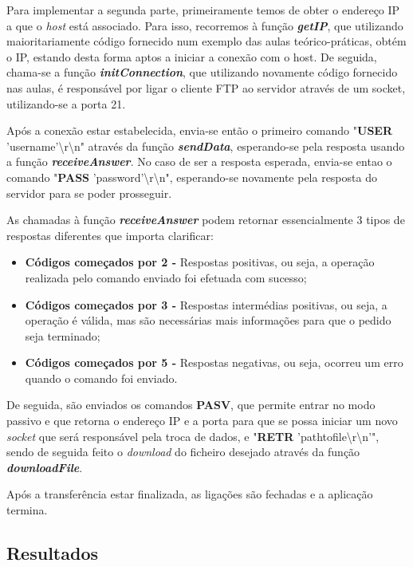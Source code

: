 \documentclass[11pt]{article}
\begin{document}
Para implementar a segunda parte, primeiramente temos de obter o endereço IP a que o \emph{host} está associado. Para isso, recorremos à função \textit{\textbf{getIP}}, que utilizando maioritariamente código fornecido num exemplo das aulas teórico-práticas, obtém o IP, estando desta forma aptos a iniciar a conexão com o host. De seguida, chama-se a função \textit{\textbf{initConnection}}, que utilizando novamente código fornecido nas aulas, é responsável por ligar o cliente FTP ao servidor através de um socket, utilizando-se a porta 21.

Após a conexão estar estabelecida, envia-se então o primeiro comando "\textbf{USER} 'username'\textbackslash r\textbackslash n" através da função \textit{\textbf{sendData}}, esperando-se pela resposta usando a função \textit{\textbf{receiveAnswer}}. No caso de ser a resposta esperada, envia-se entao o comando "\textbf{PASS} 'password'\textbackslash r\textbackslash n", esperando-se novamente pela resposta do servidor para se poder prosseguir.

As chamadas à função \textit{\textbf{receiveAnswer}} podem retornar essencialmente 3 tipos de respostas diferentes que importa clarificar:

\begin{itemize}
    \item \textbf{Códigos começados por 2 -} Respostas positivas, ou seja, a operação realizada pelo comando enviado foi efetuada com sucesso;
    \item \textbf{Códigos começados por 3 -} Respostas intermédias positivas, ou seja, a operação é válida, mas são necessárias mais informações para que o pedido seja terminado;
    \item \textbf{Códigos começados por 5 -} Respostas negativas, ou seja, ocorreu um erro quando o comando foi enviado.
\end{itemize}

De seguida, são enviados os comandos \textbf{PASV}, que permite entrar no modo passivo e que retorna o endereço IP e a porta para que se possa iniciar um novo \emph{socket} que será responsável pela troca de dados, e "\textbf{RETR} 'path\textunderscore to\textunderscore file\textbackslash r\textbackslash n'", sendo de seguida feito o \emph{download} do ficheiro desejado através da função \textit{\textbf{downloadFile}}. 

Após a transferência estar finalizada, as ligações são fechadas e a aplicação termina.

\subsection{Resultados}
\end{document}

